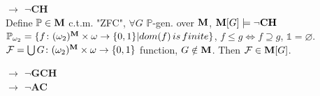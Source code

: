 \documentclass[9pt]{article}
\newcommand{\class}[1]{{\bf #1}}
\newcommand{\Pp}{\mathbb{P}}
\newcommand{\mytitle}[1]{ {\bf $\rightarrow$ #1}\\}
\begin{document}
\begin{multicols*}{2}
\mytitle{$\neg$CH}
Define $\Pp\in\class{M}$ c.t.m. "ZFC", $\forall G$ $\Pp$-gen. over $\class{M}$, $\class{M}[G]\models\neg\class{CH}$\\
$\Pp_{\omega_2}=\{f\colon (\omega_2)^\class{M}\times\omega\to\{0,1\}|dom(f)\,is\,finite\}$, $f\leqslant g\Leftrightarrow f\supseteq g$, $\mathbb{1}=\varnothing$.
$\mathcal{F}=\bigcup G\colon (\omega_2)^\class{M}\times\omega\to\{0,1\}$ function, $G\notin\class{M}$. Then $\mathcal{F}\in\class{M}[G]$.

\mytitle{$\neg$\class{GCH}}

\mytitle{$\neg$\class{AC}}
\end{multicols*}
\end{document}
